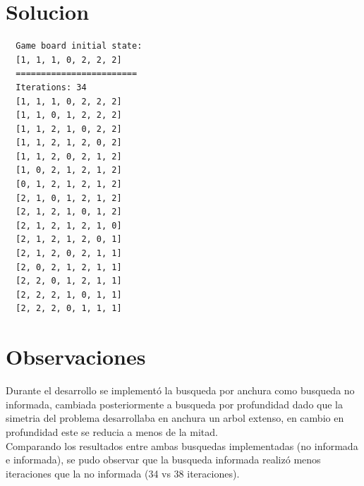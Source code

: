 \documentclass[letterpaper]{article}
\begin{document}
\section{Solucion}

\begin{lstlisting}
  Game board initial state:
  [1, 1, 1, 0, 2, 2, 2]
  ========================
  Iterations: 34
  [1, 1, 1, 0, 2, 2, 2]
  [1, 1, 0, 1, 2, 2, 2]
  [1, 1, 2, 1, 0, 2, 2]
  [1, 1, 2, 1, 2, 0, 2]
  [1, 1, 2, 0, 2, 1, 2]
  [1, 0, 2, 1, 2, 1, 2]
  [0, 1, 2, 1, 2, 1, 2]
  [2, 1, 0, 1, 2, 1, 2]
  [2, 1, 2, 1, 0, 1, 2]
  [2, 1, 2, 1, 2, 1, 0]
  [2, 1, 2, 1, 2, 0, 1]
  [2, 1, 2, 0, 2, 1, 1]
  [2, 0, 2, 1, 2, 1, 1]
  [2, 2, 0, 1, 2, 1, 1]
  [2, 2, 2, 1, 0, 1, 1]
  [2, 2, 2, 0, 1, 1, 1]
\end{lstlisting}

\section{Observaciones}

Durante el desarrollo se implementó la busqueda por anchura como busqueda no informada,
cambiada posteriormente a busqueda por profundidad dado que la simetria del problema desarrollaba en
anchura un arbol extenso, en cambio en profundidad este se reducia a menos de la mitad.\\

Comparando los resultados entre ambas busquedas implementadas (no informada e informada),
se pudo observar que la busqueda informada realizó menos iteraciones que la no informada (34 vs 38 iteraciones).
\end{document}
